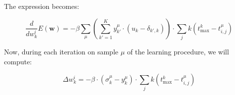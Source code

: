 The expression becomes:

\begin{equation}
    \frac{d}{dw_k^i} E(\mathbf{w}) = -\beta \sum_\mu \left(\sum_{k'=1}^K y_{k'}^\mu \cdot (u_k - \delta_{k',k})\right) \cdot \sum_j k(t_{\max}^k - t_{i,j}^\mu)
\end{equation}

Now, during each iteration on sample \(\mu\) of the learning procedure, we will compute:

\begin{equation}
    \Delta w_k^i = -\beta \cdot (\sigma_k^\mu - y_k^\mu) \cdot \sum_j k(t_{\max}^k - t_{i,j}^\mu)
\end{equation}
